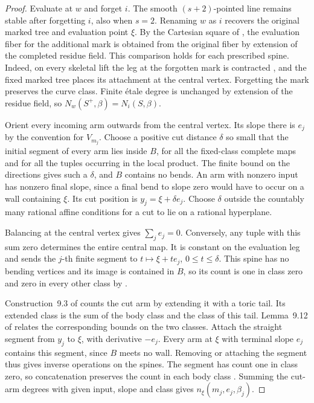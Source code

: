 \documentclass[11pt,reqno]{amsart}
\numberwithin{equation}{section}
\theoremstyle{definition}
\theoremstyle{remark}
\begin{document}
\begin{proof}
Evaluate at \(w\) and forget \(i\). The smooth \((s+2)\)-pointed line
remains stable after forgetting \(i\), also when \(s=2\). Renaming
\(w\) as \(i\) recovers the original marked tree and evaluation point
\(\xi\). By the Cartesian square of \cite[Lemma~9.13]{KY}, the
evaluation fiber for the additional mark is obtained from the original
fiber by extension of the completed residue field. This comparison
holds for each prescribed spine. Indeed, on every skeletal lift the
leg at the forgotten mark is contracted \cite[Lemma~8.22]{KY}, and
the fixed marked tree places its attachment at the central vertex.
Forgetting the mark preserves the curve class. Finite \'etale degree
is unchanged by extension of the residue field, so
\(N_w(S^+,\beta)=N_i(S,\beta)\).

Orient every incoming arm outwards from the central vertex. Its slope
there is \(e_j\) by the convention for \(V_{m_j}\). Choose a positive
cut distance \(\delta\) so small that the initial segment of every arm
lies inside \(B\), for all the fixed-class complete maps and for all the
tuples occurring in the local product. The finite bound on the directions gives such a \(\delta\), and
\(B\) contains no bends. An arm with
nonzero input has nonzero final slope, since a final bend to slope zero
would have to occur on a wall containing \(\xi\). Its cut position is
\(y_j=\xi+\delta e_j\). Choose \(\delta\) outside the countably many
rational affine conditions for a cut to lie on a rational hyperplane.

Balancing at the central vertex gives \(\sum_j e_j=0\). Conversely,
any tuple with this sum zero determines the entire central map. It is
constant on the evaluation leg and sends the \(j\)-th finite segment
to \(t\mapsto \xi+t e_j\), \(0\le t\le\delta\). This spine has no
bending vertices and its image is contained in \(B\), so its count
is one in class zero and zero in every other class by
\cite[Lemma~12.3]{KY}.

Construction~9.3 of \cite{KY} counts the cut arm by extending it with
a toric tail. Its extended class is the sum of the body class and the
class of this tail. Lemma~9.12 of \cite{KY} relates the corresponding
bounds on the two classes. Attach the straight segment from \(y_j\)
to \(\xi\), with derivative \(-e_j\). Every arm at \(\xi\) with
terminal slope \(e_j\) contains this segment, since \(B\) meets no wall.
Removing or attaching the segment thus gives inverse operations on the
spines. The segment has count one in class zero, so concatenation
preserves the count in each body class
\cite[Lemma~12.3 and Theorem~12.4]{KY}. Summing the cut-arm degrees
with given input, slope and class gives \(n_\xi(m_j,e_j,\beta_j)\).


\end{proof}
\end{document}
